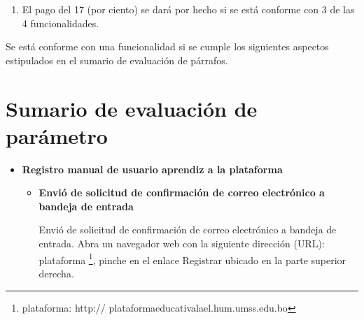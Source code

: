 \begin{enumerate}
\begin{itemize}
\end{itemize}

\item El pago del 17 (por ciento) se dará por hecho si se está conforme 
con 3 de las 4 funcionalidades.

\end{enumerate}

Se está conforme con una funcionalidad si se cumple los siguientes aspectos
estipulados en el sumario de evaluación de párrafos.

\section{Sumario de evaluación de parámetro}

\begin{itemize}

\item \textbf{Registro manual de usuario aprendiz a la plataforma}

\begin{itemize}

\item \textbf{Envió de solicitud de confirmación de correo electrónico a 
bandeja de entrada}

Envió de solicitud de confirmación de correo electrónico a bandeja
de entrada. Abra un navegador web con la siguiente dirección (URL): plataforma
\footnote{plataforma: http:// plataformaeducativalael.hum.umss.edu.bo}, pinche en 
el enlace Registrar ubicado en la parte superior derecha.


\end{itemize}
\end{itemize}

